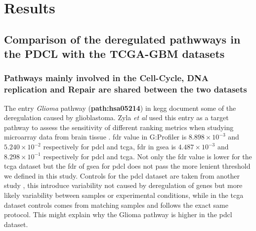 \section{Results}

\subsection{Comparison of the deregulated pathwways in the PDCL with the TCGA-GBM datasets}

\subsubsection{Pathways mainly involved in the Cell-Cycle, DNA replication and Repair are shared between the two datasets}

The entry \textit{Glioma} pathway (\textbf{path:hsa05214}) in \acrshort{kegg} document some of the deregulation caused by glioblastoma.
Zyla \textit{et al} used this entry as a target pathway to assess the sensitivity of different ranking metrics when studying microarray data from brain tissue \cite*{Zyla2017}.
\acrshort{fdr} value in G:Profiler is $8.898 \times 10^{-3}$ and $5.240 \times 10^{-2}$ respectively for \acrshort{pdcl} and \acrshort{tcga}, \acrshort{fdr} in \acrshort{gsea} is $4.487 \times 10^{-3}$ and $8.298 \times 10^{-1}$ respectively for \acrshort{pdcl} and \acrshort{tcga}.
Not only the \acrshort{fdr} value is lower for the \acrshort{tcga} dataset but the \acrshort{fdr} of \acrshort{gsea} for \acrshort{pdcl} does not pass the more lenient threshold we defined in this study.
Controls for the \acrshort{pdcl} dataset are taken from another study \cite*{Lundin2018}, this introduce variability not caused by deregulation of genes but more likely variability between samples or experimental conditions, while in the \acrshort{tcga} dataset controls comes from matching samples and follows the exact same protocol.
This might explain why the Glioma pathway is higher in the \acrshort{pdcl} dataset.

